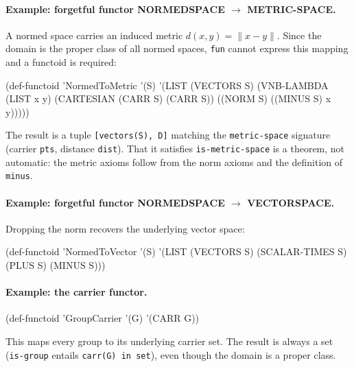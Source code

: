 \paragraph{Example: forgetful functor NORMEDSPACE $\to$ METRIC-SPACE.}
A normed space carries an induced metric $d(x,y) = \|x - y\|$.
Since the domain is the proper class of all normed spaces, \texttt{fun}
cannot express this mapping and a functoid is required:

\begin{VNBcode}
(def-functoid 'NormedToMetric '(S)
  '(LIST (VECTORS S)
         (VNB-LAMBDA (LIST x y) (CARTESIAN (CARR S) (CARR S)) ((NORM S) ((MINUS S) x y)))))
\end{VNBcode}

The result is a tuple \texttt{[vectors(S), D]} matching the
\texttt{metric-space} signature (carrier \texttt{pts}, distance \texttt{dist}).
That it satisfies \texttt{is-metric-space} is a theorem, not automatic:
the metric axioms follow from the norm axioms and the definition of
\texttt{minus}.

\paragraph{Example: forgetful functor NORMEDSPACE $\to$ VECTORSPACE.}
Dropping the norm recovers the underlying vector space:

\begin{VNBcode}
(def-functoid 'NormedToVector '(S)
  '(LIST (VECTORS S) (SCALAR-TIMES S) (PLUS S) (MINUS S)))
\end{VNBcode}

\paragraph{Example: the carrier functor.}
\begin{VNBcode}
(def-functoid 'GroupCarrier '(G) '(CARR G))
\end{VNBcode}
This maps every group to its underlying carrier set.  The result is
always a set (\texttt{is-group} entails \texttt{carr(G) in set}),
even though the domain is a proper class.

